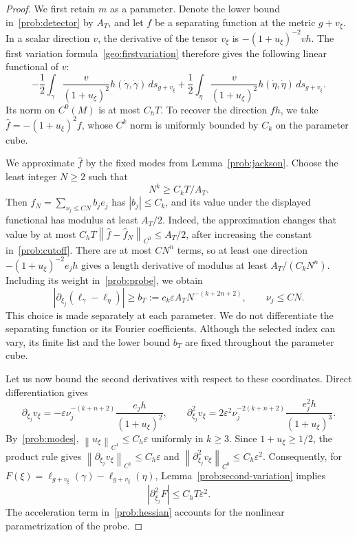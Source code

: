 \documentclass[10pt,oneside,reqno]{amsproc}
\numberwithin{equation}{section}
\theoremstyle{definition}
\theoremstyle{remark}
\newcommand{\norm}[1]{\left\|#1\right\|}
\newcommand{\eps}{\varepsilon}
\renewcommand{\ge}{\geqslant}
\renewcommand{\le}{\leqslant}
\begin{document}
\begin{proof}
We first retain $m$ as a parameter. Denote the lower bound in~\eqref{prob:detector} by $A_T$, and let $f$ be a separating function at the metric $g+v_\xi$. In a scalar direction $v$, the derivative of the tensor $v_\xi$ is $-(1+u_\xi)^{-2}vh$. The first variation formula~\eqref{geo:firstvariation} therefore gives the following linear functional of $v$:
\[
 -\frac12\int_\gamma\frac{v}{(1+u_\xi)^2}h(\dot\gamma,\dot\gamma)\,ds_{g+v_\xi}+\frac12\int_\eta\frac{v}{(1+u_\xi)^2}h(\dot\eta,\dot\eta)\,ds_{g+v_\xi}.
\]
Its norm on $C^0(M)$ is at most $C_hT$. To recover the direction $fh$, we take $\widehat f=-(1+u_\xi)^2f$, whose $C^k$ norm is uniformly bounded by $C_k$ on the parameter cube.

We approximate $\widehat f$ by the fixed modes from Lemma~\ref{prob:jackson}. Choose the least integer $N\ge2$ such that
\begin{equation}
 N^k\ge C_kT/A_T.
 \label{prob:cutoff}
\end{equation}
Then $\widehat f_N=\sum_{\nu_j\le CN}b_je_j$ has $|b_j|\le C_k$, and its value under the displayed functional has modulus at least $A_T/2$. Indeed, the approximation changes that value by at most $C_hT\norm{\widehat f-\widehat f_N}_{C^0}\le A_T/2$, after increasing the constant in~\eqref{prob:cutoff}. There are at most $CN^n$ terms, so at least one direction $-(1+u_\xi)^{-2}e_jh$ gives a length derivative of modulus at least $A_T/(C_kN^n)$. Including its weight in~\eqref{prob:probe}, we obtain
\begin{equation}
 |\partial_{\xi_j}(\ell_\gamma-\ell_\eta)|\ge b_T:=c_k\eps A_TN^{-(k+2n+2)},\qquad \nu_j\le CN.
 \label{prob:coordinate}
\end{equation}
This choice is made separately at each parameter. We do not differentiate the separating function or its Fourier coefficients. Although the selected index can vary, its finite list and the lower bound $b_T$ are fixed throughout the parameter cube.

Let us now bound the second derivatives with respect to these coordinates. Direct differentiation gives
\[
 \partial_{\xi_j}v_\xi=-\eps\nu_j^{-(k+n+2)}\frac{e_jh}{(1+u_\xi)^2},\qquad \partial_{\xi_j}^2v_\xi=2\eps^2\nu_j^{-2(k+n+2)}\frac{e_j^2h}{(1+u_\xi)^3}.
\]
By~\eqref{prob:modes}, $\norm{u_\xi}_{C^1}\le C_h\eps$ uniformly in $k\ge3$. Since $1+u_\xi\ge1/2$, the product rule gives $\norm{\partial_{\xi_j}v_\xi}_{C^1}\le C_h\eps$ and $\norm{\partial_{\xi_j}^2v_\xi}_{C^0}\le C_h\eps^2$. Consequently, for $F(\xi)=\ell_{g+v_\xi}(\gamma)-\ell_{g+v_\xi}(\eta)$, Lemma~\ref{prob:second-variation} implies
\[
 |\partial_{\xi_j}^2F|\le C_hT\eps^2.
\]
The acceleration term in~\eqref{prob:hessian} accounts for the nonlinear parametrization of the probe.


\end{proof}
\end{document}
